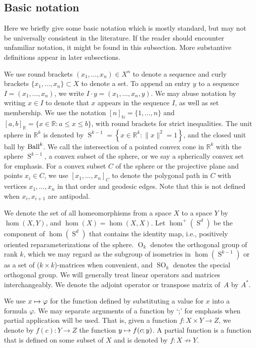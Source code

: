 \documentclass[11pt]{article}
\newcommand{\ie}{i.e.,\xspace}
\numberwithin{equation}{section}
\newcommand\mto{\mathchoice{\longmapsto}{\mapsto}{\mapsto}{\mapsto}}
\theoremstyle{remark}
\let\mb\mathbb
\DeclareMathOperator{\orth}{O}
\DeclareMathOperator{\sorth}{SO}
\DeclareMathOperator{\sphere}{S}
\newcommand{\Ball}{\text{\rm Ball}}
\begin{document}
\subsection{Basic notation}

Here we briefly give some basic notation which is mostly standard, but may not be universally consistent in the literature. If the reader should encounter unfamiliar notation, it might be found in this subsection. More substantive definitions appear in later subsections.

We use round brackets
$(x_1,\dots,x_n) \in X^n$ to denote a sequence and curly brackets $\{x_1,\dots,x_n\} \subset X$ to denote a set.
To append an entry $y$ to a sequence $I = (x_1,\dots,x_n)$, we write $I \cdot y = (x_1,\dots,x_{n},y)$.
We may abuse notation by writing $x\in I$ to denote that $x$ appears in the sequence $I$, as well as set membership.
We use the notation $[n]_{\mb{N}} = \{1,\dots,n\}$ and $[a,b]_{\mb{R}} = \{x \in \mb{R} : a \leq x \leq b\}$,
with round brackets for strict inequalities.
The unit sphere in $\mb{R}^k$ is denoted by $\sphere^{k-1} = \left\{ x\in \mb{R}^k : \|x\|^2 = 1 \right\}$, and the closed unit ball by $\Ball^k$.
We call the intersection of a pointed convex cone in $\mb{R}^k$ with the sphere $\sphere^{k-1}$, a convex subset of the sphere, or we say a spherically convex set for emphasis.
For a convex subset $C$ of the sphere or the projective plane and points $x_i \in C$, we use $[x_1,\dots,x_n]_C$ to denote the polygonal path in $C$ with vertices $x_1,\dots,x_n$ in that order and geodesic edges. Note that this is not defined when $x_i,x_{i+1}$ are antipodal.

We denote the set of all homeomorphisms from a space $X$ to a space $Y$ by
$\hom(X,Y)$,
and $\hom(X) = \hom(X,X)$.
Let $\hom^+(\sphere^d)$ be
the component of $\hom(\sphere^d)$ that contains the identity map,
\ie positively oriented reparameterizations of the sphere.
$\orth_k$ denotes the orthogonal group of rank $k$, which we may regard as the subgroup of isometries in $\hom(\sphere^{k-1})$ or as a set of ($k\times k$)-matrices when convenient, and $\sorth_k$ denotes the special orthogonal group.
We will generally treat linear operators and matrices interchangeably.
We denote the adjoint operator or transpose matrix of~$A$ by $A^*$.	

We use $x \mto \varphi$ for the function defined by substituting a value for $x$ into a formula $\varphi$.
We may separate arguments of a function by `;' for emphasis when partial application will be used. That is, given a function $f : X \times Y \to Z$, we denote by $f(c) : Y \to Z$ the function $y \mto f(c;y)$.
A partial function is a function that is defined on some subset of $X$ and is denoted by $f:X \not\to Y$.
\end{document}
